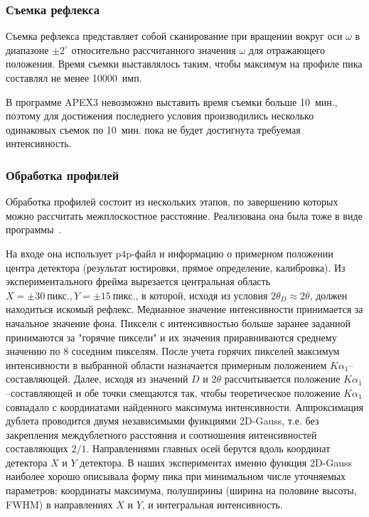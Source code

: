 \documentclass[a4paper,14pt]{extarticle}
\newcommand{\unit}[1]{ \ \text{#1}}
\newcommand{\degree}{^\circ}
\begin{document}
\subsubsection{Съемка рефлекса}
Съемка рефлекса представляет собой сканирование при вращении вокруг оси $\omega$ в диапазоне $\pm 2\degree$ относительно рассчитанного значения $\omega$ для отражающего положения.
Время съемки выставлялось таким, чтобы максимум на профиле пика составлял не менее 10000~имп.

В программе APEX3 невозможно выставить время съемки больше 10~мин., поэтому для достижения последнего условия производились несколько одинаковых съемок по 10~мин. пока не будет достигнута требуемая интенсивность.
\subsubsection{Обработка профилей}
Обработка профилей состоит из нескольких этапов, по завершению которых можно рассчитать межплоскостное расстояние.
Реализована она была тоже в виде программы~\cite{Kudryavtsev:2024:eccentr}.

На входе она использует p4p-файл и информацию о примерном положении центра детектора (результат юстировки, прямое определение, калибровка).
Из экспериментального фрейма вырезается центральная область $X = \pm 30\unit{пикс.}, Y = \pm 15\unit{пикс.}$, в которой, исходя из условия $2\theta_D \approx 2\theta$, должен находиться искомый рефлекс.
Медианное значение интенсивности принимается за начальное значение фона.
Пиксели с интенсивностью больше заранее заданной принимаются за "горячие пиксели" и их значения приравниваются среднему значению по 8 соседним пикселям.
После учета горячих пикселей максимум интенсивности в выбранной области назначается примерным положением $K\alpha_1$--составляющей.
Далее, исходя из значений $D$ и $2\theta$ рассчитывается положение $K\alpha_1$--составляющей и обе точки смещаются так, чтобы теоретическое положение $K\alpha_1$ совпадало с координатами найденного максимума интенсивности.
Аппроксимация дублета проводится двумя независимыми  функциями 2D-Gauss, т.е. без закрепления междублетного расстояния и соотношения интенсивностей составляющих $2/1$.
Направлениями главных осей берутся вдоль координат детектора $X$ и $Y$ детектора.
В наших экспериментах именно функция 2D-Gauss наиболее хорошо описывала форму пика при минимальном числе уточняемых параметров: координаты максимума, полуширины (ширина на половине высоты, FWHM) в направлениях $X$ и $Y$, и интегральная интенсивность.
\end{document}
